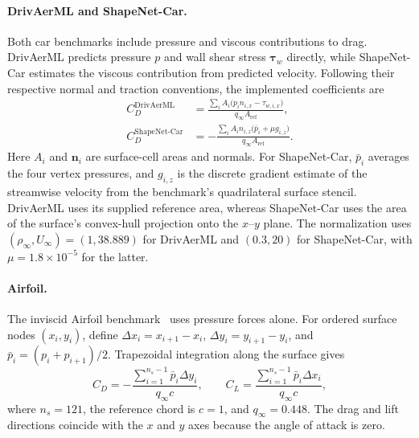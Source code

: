 \documentclass{article}
\begin{document}
\paragraph{DrivAerML and ShapeNet-Car.}
Both car benchmarks include pressure and viscous contributions to drag. DrivAerML predicts pressure $p$ and wall shear stress $\boldsymbol{\tau}_w$ directly, while ShapeNet-Car estimates the viscous contribution from predicted velocity. Following their respective normal and traction conventions, the implemented coefficients are
\begin{equation}
    \begin{aligned}
        C_D^{\mathrm{DrivAerML}}
        &=\frac{\sum_i A_i\bigl(p_i n_{i,x}-\tau_{w,i,x}\bigr)}{q_\infty A_{\mathrm{ref}}},\\
        C_D^{\mathrm{ShapeNet\text{-}Car}}
        &=-\frac{\sum_i A_i n_{i,z}\bigl(\bar p_i+\mu g_{i,z}\bigr)}{q_\infty A_{\mathrm{ref}}}.
    \end{aligned}
    \label{eq:app_car_drag}
\end{equation}
Here $A_i$ and $\mathbf{n}_i$ are surface-cell areas and normals. For ShapeNet-Car, $\bar p_i$ averages the four vertex pressures, and $g_{i,z}$ is the discrete gradient estimate of the streamwise velocity from the benchmark's quadrilateral surface stencil. DrivAerML uses its supplied reference area, whereas ShapeNet-Car uses the area of the surface's convex-hull projection onto the $x$--$y$ plane. The normalization uses $(\rho_\infty,U_\infty)=(1,38.889)$ for DrivAerML and $(0.3,20)$ for ShapeNet-Car, with $\mu=1.8\times10^{-5}$ for the latter.

\paragraph{Airfoil.}
The inviscid Airfoil benchmark~\citep{li2023geofno} uses pressure forces alone. For ordered surface nodes $(x_i,y_i)$, define $\Delta x_i=x_{i+1}-x_i$, $\Delta y_i=y_{i+1}-y_i$, and $\bar p_i=(p_i+p_{i+1})/2$. Trapezoidal integration along the surface gives
\begin{equation}
    C_D=-\frac{\sum_{i=1}^{n_s-1}\bar p_i\Delta y_i}{q_\infty c},
    \qquad
    C_L=\frac{\sum_{i=1}^{n_s-1}\bar p_i\Delta x_i}{q_\infty c},
    \label{eq:app_airfoil_coefficients}
\end{equation}
where $n_s=121$, the reference chord is $c=1$, and $q_\infty=0.448$. The drag and lift directions coincide with the $x$ and $y$ axes because the angle of attack is zero.
\end{document}

